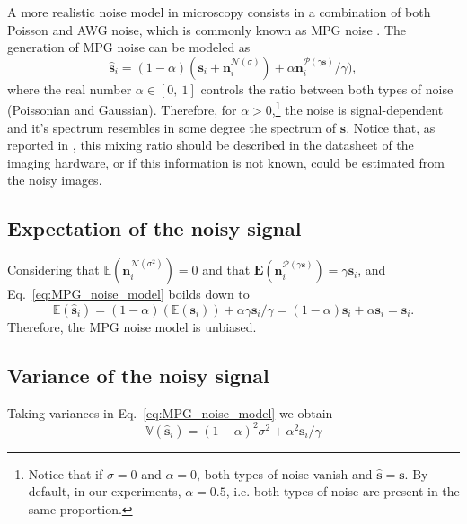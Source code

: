 A more realistic noise model in microscopy consists in a combination
of both Poisson and \gls{AWG} noise, which is commonly known as
\gls{MPG} noise \cite{meiniel2018denoising}. The generation of
\gls{MPG} noise can be modeled as
\begin{equation}
  \hat{\mathbf{s}}_i = (1-\alpha)(\mathbf{s}_i + \mathbf{n}^{\mathcal{N}(\sigma)}_i) + \alpha\mathbf{n}^{\mathcal{P}(\gamma\mathbf{s})}_i/\gamma),
  \label{eq:MPG_noise_model} 
\end{equation}
where the real number $\alpha\in[0,~1]$ controls the ratio between
both types of noise (Poissonian and Gaussian). Therefore, for
$\alpha > 0$,\footnote{Notice that if $\sigma=0$ and $\alpha=0$, both
  types of noise vanish and $\hat{\mathbf{s}}=\mathbf{s}$. By default,
  in our experiments, $\alpha=0.5$, i.e. both types of noise are
  present in the same proportion.} the noise is signal-dependent and
it's spectrum resembles in some degree the spectrum of
$\mathbf{s}$. Notice that, as reported in \cite{foi2008practical},
this mixing ratio should be described in the datasheet of the imaging
hardware, or if this information is not known, could be estimated from
the noisy images.

\subsection{Expectation of the noisy signal}
Considering that $\mathbb{E}(\mathbf{n}^{\mathcal{N}(\sigma^2)}_i)=0$
and that
$\mathbf{E}(\mathbf{n}^{\mathcal{P}(\gamma\mathbf{s})}_i)=\gamma\mathbf{s}_i$, and Eq.~\ref{eq:MPG_noise_model} boilds down to
\begin{equation}
  \mathbb{E}(\hat{\mathbf{s}}_i) = (1-\alpha)(\mathbb{E}(\mathbf{s}_i)) + \alpha\gamma\mathbf{s}_i/\gamma = (1-\alpha)\mathbf{s}_i + \alpha\mathbf{s}_i = \mathbf{s}_i.
  \label{eq:E_MPG}
\end{equation}
Therefore, the \gls{MPG} noise model is unbiased.

\subsection{Variance of the noisy signal}
Taking variances in Eq.~\ref{eq:MPG_noise_model} we obtain
\begin{equation}
  \mathbb{V}(\hat{\mathbf{s}}_i) = (1-\alpha)^2\sigma^2 + \alpha^2\mathbf{s}_i/\gamma
  \label{eq:V_MPG}
\end{equation}

